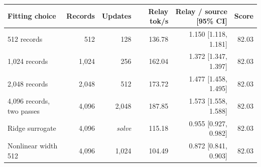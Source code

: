 \begin{tabular}{lrrrrr}
\toprule
Fitting choice & Records & Updates & Relay tok/s & Relay / source [95\% CI] & Score \\
\midrule
512 records & 512 & 128 & 136.78 & 1.150 [1.118, 1.181] & 82.03 \\
1,024 records & 1,024 & 256 & 162.04 & 1.372 [1.347, 1.397] & 82.03 \\
2,048 records & 2,048 & 512 & 173.72 & 1.477 [1.458, 1.495] & 82.03 \\
4,096 records, two passes & 4,096 & 2,048 & 187.85 & 1.573 [1.558, 1.588] & 82.03 \\
Ridge surrogate & 4,096 & \textit{solve} & 115.18 & 0.955 [0.927, 0.982] & 82.03 \\
Nonlinear width 512 & 4,096 & 1,024 & 104.49 & 0.872 [0.841, 0.903] & 82.03 \\
\bottomrule
\end{tabular}

